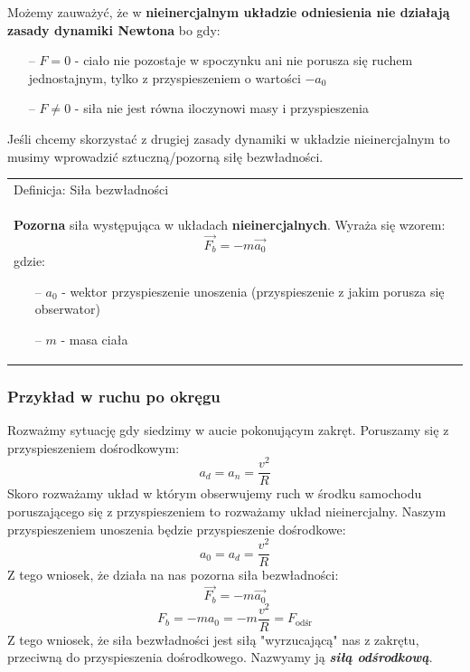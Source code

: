 \documentclass[a4paper]{article}
\newenvironment{definition}[2][Definicja]
    {
        \begin{center}
        \begin{tabular}{|p{1\textwidth}|}
        \hline
            #1: #2\\[2ex]
        \begin{em}
        \Large
    }
    { 
        \end{em}
        \\\hline
        \end{tabular} 
        \end{center}
    }
\begin{document}
    Możemy zauważyć, że w \textbf{nieinercjalnym układzie odniesienia nie działają zasady dynamiki Newtona} bo gdy:
    \begin{itemize}
        \item[--] $F = 0$ - ciało nie pozostaje w spoczynku ani nie porusza się ruchem jednostajnym, 
        tylko z przyspieszeniem o wartości $-a_0$
        \item[--] $F \neq 0$ - siła nie jest równa iloczynowi masy i przyspieszenia
    \end{itemize}
    Jeśli chcemy skorzystać z drugiej zasady dynamiki w układzie nieinercjalnym to musimy wprowadzić sztuczną/pozorną 
    siłę bezwładności.
    \begin{definition}{Siła bezwładności}
        \textbf{Pozorna} siła występująca w układach \textbf{nieinercjalnych}. Wyraża się wzorem:
        \[\vec{F_b} = -m\vec{a_0}\]
        gdzie:
        \begin{itemize}
            \item[--] $a_0$ - wektor przyspieszenie unoszenia (przyspieszenie z jakim porusza się obserwator)
            \item[--] $m$ - masa ciała
        \end{itemize}
    \end{definition}
    \subsubsection*{\Large Przykład w ruchu po okręgu}
    Rozważmy sytuację gdy siedzimy w aucie pokonującym zakręt. Poruszamy się z przyspieszeniem dośrodkowym:
    \[a_d = a_n = \frac{v^2}{R}\]
    Skoro rozważamy układ w którym obserwujemy ruch w środku samochodu poruszającego się z przyspieszeniem
    to rozważamy układ nieinercjalny. Naszym przyspieszeniem unoszenia będzie przyspieszenie dośrodkowe:
    \[a_0 = a_d = \frac{v^2}{R}\]
    Z tego wniosek, że działa na nas pozorna siła bezwładności:
    \[\vec{F_b} = -m\vec{a_0}\]
    \[F_b = -ma_0 = -m\frac{v^2}{R} = F_{\text{odśr}}\] 
    Z tego wniosek, że siła bezwładności jest siłą "wyrzucającą" nas z zakrętu, przeciwną do przyspieszenia
    dośrodkowego. Nazwyamy ją \textbf{\em{siłą odśrodkową}}.
\end{document}
